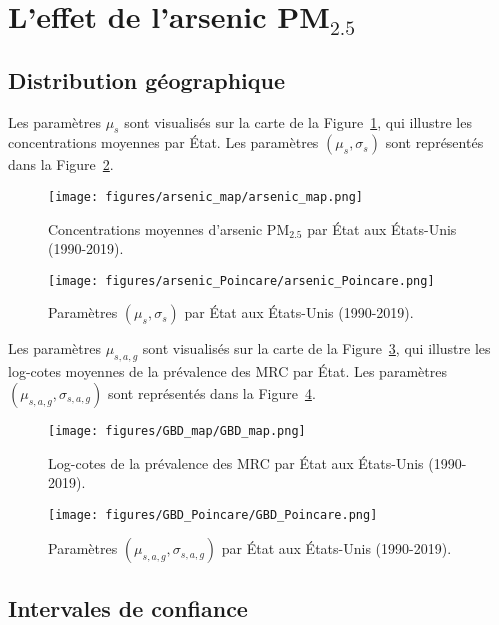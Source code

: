 \section{L'effet de l'arsenic PM\(_{2.5}\)}

\subsection{Distribution géographique}

Les paramètres \(\mu_s\) sont visualisés sur la carte de la Figure~\ref{fig:arsenic-map}, qui illustre les concentrations moyennes par État. Les paramètres \((\mu_s, \sigma_s)\) sont représentés dans la Figure~\ref{fig:arsenic_Poincare}.

\begin{figure}[H]
	\centering
	\texttt{[image: figures/arsenic\_map/arsenic\_map.png]}
	\caption{Concentrations moyennes d'arsenic PM\(_{2.5}\) par État aux États-Unis (1990-2019).}
	\label{fig:arsenic-map}
\end{figure}

\begin{figure}[H]
	\centering
	\texttt{[image: figures/arsenic\_Poincare/arsenic\_Poincare.png]}
	\caption{Paramètres \((\mu_s, \sigma_s)\) par État aux États-Unis (1990-2019).}
	\label{fig:arsenic_Poincare}
\end{figure}

Les paramètres \(\mu_{s,a,g}\) sont visualisés sur la carte de la Figure~\ref{fig:GBD-map}, qui illustre les log-cotes moyennes de la prévalence des MRC par État. Les paramètres \((\mu_{s,a,g}, \sigma_{s,a,g})\) sont représentés dans la Figure~\ref{fig:GBD_Poincare}.

\begin{figure}[H]
	\centering
	\texttt{[image: figures/GBD\_map/GBD\_map.png]}
	\caption{Log-cotes de la prévalence des MRC par État aux États-Unis (1990-2019).}
	\label{fig:GBD-map}
\end{figure}

\begin{figure}[H]
	\centering
	\texttt{[image: figures/GBD\_Poincare/GBD\_Poincare.png]}
	\caption{Paramètres \((\mu_{s,a,g}, \sigma_{s,a,g})\) par État aux États-Unis (1990-2019).}
	\label{fig:GBD_Poincare}
\end{figure}

\subsection{Intervales de confiance}

